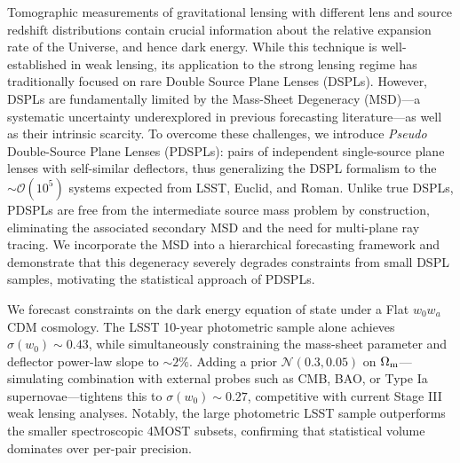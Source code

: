 Tomographic measurements of gravitational lensing with different lens and source redshift distributions contain crucial information about the relative expansion rate of the Universe, and hence dark energy. 
%
While this technique is well-established in weak lensing, its application to the strong lensing regime has traditionally focused on rare Double Source Plane Lenses (DSPLs). However, DSPLs are fundamentally limited by the Mass-Sheet Degeneracy (MSD)—a systematic uncertainty underexplored in previous forecasting literature—as well as their intrinsic scarcity.
%
%
To overcome these challenges, we introduce \emph{Pseudo} Double-Source Plane Lenses 
(PDSPLs): pairs of independent single-source plane lenses with self-similar deflectors, thus generalizing the DSPL formalism to the $\sim\mathcal{O}(10^5)$ systems expected from LSST, Euclid, and Roman. Unlike true DSPLs, PDSPLs are free from the intermediate source mass problem by construction, eliminating the associated secondary MSD and the need for multi-plane ray tracing. We incorporate the MSD into a hierarchical forecasting framework and demonstrate that this degeneracy severely degrades constraints from small DSPL samples, motivating the statistical approach of PDSPLs.

%
We forecast constraints on the dark energy equation of state under a Flat 
$w_0w_a$CDM cosmology. The LSST 10-year photometric sample alone achieves 
$\sigma(w_0) \sim 0.43$, while simultaneously constraining the mass-sheet parameter 
and deflector power-law slope to $\sim2\%$. Adding a prior $\mathcal{N}(0.3, 0.05)$ 
on $\Omega_{\rm m}$—simulating combination with external probes such as CMB, BAO, or 
Type Ia supernovae—tightens this to $\sigma(w_0) \sim 0.27$, competitive with current 
Stage III weak lensing analyses. Notably, the large photometric LSST sample 
outperforms the smaller spectroscopic 4MOST subsets, confirming that statistical 
volume dominates over per-pair precision.